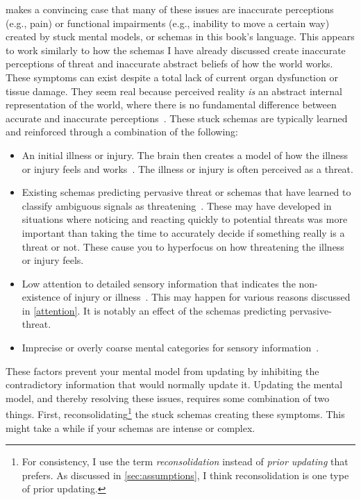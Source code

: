 \documentclass[11pt,oneside]{book}
\let\cite\parencite
\begin{document}
\textcite{berghPsychogenic} makes a convincing case that many of these issues are inaccurate perceptions (e.g., pain) or functional impairments (e.g., inability to move a certain way) created by stuck mental models, or schemas in this book's language. This appears to work similarly to how the schemas I have already discussed create inaccurate perceptions of threat and inaccurate abstract beliefs of how the world works. These symptoms can exist despite a total lack of current organ dysfunction or tissue damage. They seem real because perceived reality \textit{is} an abstract internal representation of the world, where there is no fundamental difference between accurate and inaccurate perceptions~\cite{clark2015surfing}. These stuck schemas are typically learned and reinforced through a combination of the following:
\begin{itemize}
    \item An initial illness or injury. The brain then creates a model of how the illness or injury feels and works~\cite{berghPsychogenic}. The illness or injury is often perceived as a threat.
    \item Existing schemas predicting pervasive threat or schemas that have learned to classify ambiguous signals as threatening~\cite{berghBSTS}. These may have developed in situations where noticing and reacting quickly to potential threats was more important than taking the time to accurately decide if something really is a threat or not. These cause you to hyperfocus on how threatening the illness or injury feels.
    \item Low attention to detailed sensory information that indicates the non-existence of injury or illness~\cite{berghBSTS}. This may happen for various reasons discussed in \cref{attention}. It is notably an effect of the schemas predicting pervasive-threat.
    \item Imprecise or overly coarse mental categories for sensory information~\cite{berghPsychogenic}.
\end{itemize}

These factors prevent your mental model from updating by inhibiting the contradictory information that would normally update it. Updating the mental model, and thereby resolving these issues, requires some combination of two things. First, reconsolidating\footnote{For consistency, I use the term \textit{reconsolidation} instead of \textit{prior updating} that \textcite{berghPsychogenic} prefers. As discussed in \cref{sec:assumptions}, I think reconsolidation is one type of prior updating.} the stuck schemas creating these symptoms. This might take a while if your schemas are intense or complex.
\end{document}
